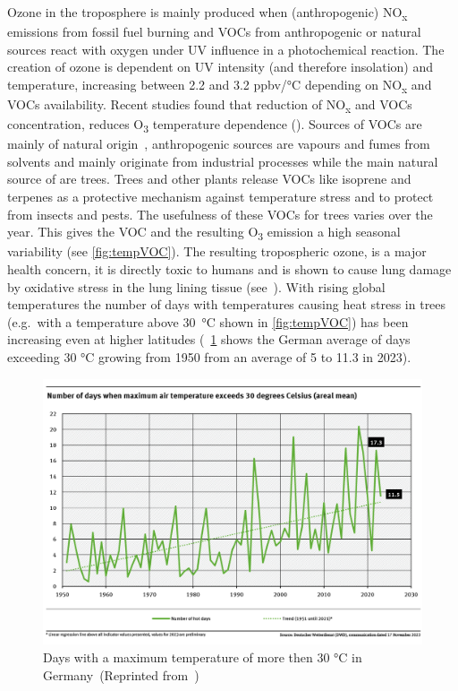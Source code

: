 \documentclass[12pt,a4paper, english,twoside]{scrartcl}
\begin{document}
      Ozone in the troposphere is mainly produced when (anthropogenic) NO\textsubscript{x} emissions from fossil fuel burning and \glspl{VOC} from anthropogenic or natural sources react with oxygen under UV influence in a photochemical reaction.
      The creation of ozone is dependent on UV intensity (and therefore insolation) and temperature, increasing between 2.2 and 3.2 ppbv/°C depending on NO\textsubscript{x} and \glspl{VOC} availability. 
      Recent studies found that reduction of NO\textsubscript{x} and \glspl{VOC} concentration, reduces O\textsubscript{3} temperature dependence (\cite{Otero2021}).
      Sources of \glspl{VOC} are mainly of natural origin~\autocite{Kansal2009}, anthropogenic sources are vapours and fumes from solvents and mainly originate from industrial processes while the main natural source of  are trees.
      Trees and other plants release VOCs like isoprene and terpenes as a protective mechanism against temperature stress and to protect from insects and pests. 
      The usefulness of these \glspl{VOC} for trees varies over the year.
      This gives the \gls{VOC} and the resulting O\textsubscript{3} emission a high seasonal variability (see \cref{fig:tempVOC}). 
      The resulting tropospheric ozone, is a major health concern, it is directly toxic to humans and is shown to cause lung damage by oxidative stress in the lung lining tissue (see~\cite{Mudway2000}). 
      With rising global temperatures the number of days with temperatures causing heat stress in trees (e.g.\ with a temperature above 30~°C shown in \cref{fig:tempVOC}) has been increasing even at higher latitudes (~\cref{fig:ubaTemps} shows the German average of days exceeding 30 °C growing from 1950 from an average of 5 to 11.3 in 2023).
      \begin{figure}[htbp]
       \begin{center}
         \includegraphics[width=\textwidth]{img/ubaTemp.png}
       \end{center}
       \caption{Days with a maximum temperature of more then 30 °C in Germany~(Reprinted from~\cite{Wilke2023})\label{fig:ubaTemps}}
      \end{figure}
\end{document}
